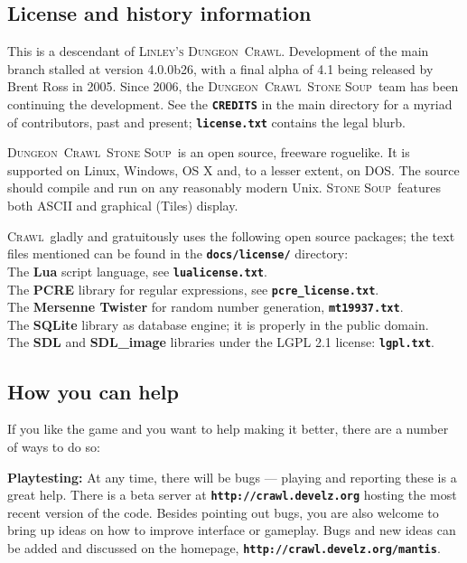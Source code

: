 \documentclass[a4paper,10pt]{article}
\newcommand{\key}[1]{{{\texttt{\textbf{#1}}}}} %
\newcommand{\slsl}{/\hspace{-0.2em}/} %
\newcommand{\crawl}{\textsc{Crawl}}
\newcommand{\dungeon}{\textsc{Dungeon}}
\newcommand{\soup}{\textsc{Stone Soup}}
\newcommand{\para}{\vspace{1.5ex}}
\begin{document}
\subsection*{License and history information}

This is a descendant of \textsc{Linley's} \dungeon\ \crawl. 
Development of the main branch stalled at version 4.0.0b26, with a final 
alpha of 4.1 being released by Brent Ross in 2005. Since 2006, the 
\dungeon\ \crawl\ \soup\ team has been continuing the 
development. See the \key{CREDITS} in the main directory for a myriad of 
contributors, past and present; \key{license.txt} contains the legal blurb.

\dungeon\ \crawl\ \soup\ is an open source, freeware roguelike. It is 
supported on Linux, Windows, OS X  and, to a lesser extent, on DOS. The 
source should compile and run on any reasonably modern Unix. \soup\ 
features both ASCII and graphical (Tiles) display.

\crawl\ gladly and gratuitously uses the following open source packages; the
text files mentioned can be found in the \key{docs/license/} directory: \\
The \textbf{Lua} script language, see \key{lualicense.txt}.\\
The \textbf{PCRE} library for regular expressions, see \key{pcre\_license.txt}.\\
The \textbf{Mersenne Twister} for random number generation, \key{mt19937.txt}.\\
The \textbf{SQLite} library as database engine; it is properly in the public domain.\\
The \textbf{SDL} and \textbf{SDL\_image} libraries under the LGPL 2.1 license: 
    \key{lgpl.txt}.


\subsection*{How you can help}

If you like the game and you want to help making it better, there are a number 
of ways to do so:

\para

\textbf{Playtesting:}
At any time, there will be bugs --- playing and reporting these is a great 
help. There is a beta server at \key{http:\slsl crawl.develz.org} hosting the
most recent version of the code. Besides pointing out bugs, you are also 
welcome to bring up ideas on how to improve interface or gameplay. Bugs and
new ideas can be added and discussed on the homepage, 
\key{http:\slsl crawl.develz.org/mantis}.
\end{document}
